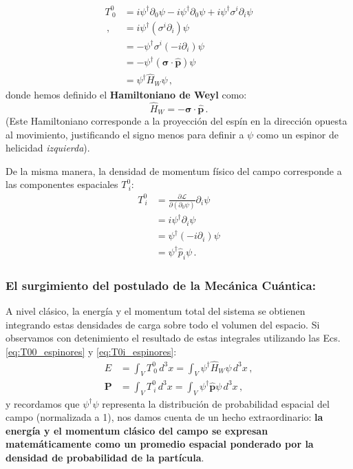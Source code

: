 \begin{frame}
\begin{align}
  T^0_{\ 0}   &= i\psi^\dagger \partial_0 \psi  - i\psi^\dagger  \partial_0 \psi + i\psi^\dagger {\sigma}^i \partial_i \psi \nonumber\\  \,,
  &= i\psi^\dagger (\sigma^i \partial_i) \psi \nonumber \\
    &= -\psi^\dagger \sigma^i (-i\partial_i) \psi \nonumber \\
    &= -\psi^\dagger (\boldsymbol{\sigma} \cdot \mathbf{\hat{p}})\psi \nonumber \\
    &= \psi^\dagger \hat{H}_W \psi \, ,
    \label{eq:T00_espinores}
\end{align}
donde hemos definido el \textbf{Hamiltoniano de Weyl} como:
\begin{equation}
    \hat{H}_W = -\boldsymbol{\sigma} \cdot \mathbf{\hat{p}} \, .
\end{equation}
(Este Hamiltoniano corresponde a la proyección del espín en la dirección opuesta al movimiento, justificando el signo menos para definir a $\psi$ como un espinor de helicidad \textit{izquierda}).

De la misma manera, la densidad de momentum físico del campo corresponde a las componentes espaciales $T^0_{\ i}$:
\begin{align}
    T^0_{\ i} &= \frac{\partial \mathcal{L}}{\partial (\partial_0 \psi)} \partial_i \psi \nonumber \\
    &= i\psi^\dagger \partial_i \psi \nonumber \\
    &= \psi^\dagger (-i\partial_i)\psi \nonumber \\
    &= \psi^\dagger \hat{p}_i \psi \, .
    \label{eq:T0i_espinores}
\end{align}

\subsubsection*{El surgimiento del postulado de la Mecánica Cuántica:}
A nivel clásico, la energía y el momentum total del sistema se obtienen integrando estas densidades de carga sobre todo el volumen del espacio. Si observamos con detenimiento el resultado de estas integrales utilizando las Ecs. \eqref{eq:T00_espinores} y \eqref{eq:T0i_espinores}:
\begin{align}
    E &= \int_V T^0_{\ 0} \, d^3x = \int_V \psi^\dagger \hat{H}_W \psi \, d^3x \, , \\
    \mathbf{P} &= \int_V T^0_{\ i} \, d^3x = \int_V \psi^\dagger \mathbf{\hat{p}} \psi \, d^3x \, ,
\end{align}
y recordamos que $\psi^\dagger \psi$ representa la distribución de probabilidad espacial del campo (normalizada a 1), nos damos cuenta de un hecho extraordinario: \textbf{la energía y el momentum clásico del campo se expresan matemáticamente como un promedio espacial ponderado por la densidad de probabilidad de la partícula}. 


\end{frame}
